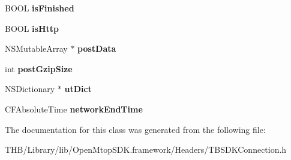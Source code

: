 \begin{DoxyCompactItemize}
\item 
\mbox{\label{interface_t_b_s_d_k_connection_acce8dd8a20a84f3a3c1cd34477b7c1f4}} 
B\+O\+OL {\bfseries is\+Finished}
\item 
\mbox{\label{interface_t_b_s_d_k_connection_ae0d8b0e9a2ffab51f7c52217f6e13edb}} 
B\+O\+OL {\bfseries is\+Http}
\item 
\mbox{\label{interface_t_b_s_d_k_connection_a36572ffb82b2d7b27e72c13c91c4f879}} 
N\+S\+Mutable\+Array $\ast$ {\bfseries post\+Data}
\item 
\mbox{\label{interface_t_b_s_d_k_connection_aa9331e40288bb5edc4591f1c1dbe9ce0}} 
int {\bfseries post\+Gzip\+Size}
\item 
\mbox{\label{interface_t_b_s_d_k_connection_a92c7092323d0a11dc96e27065f6d45e8}} 
N\+S\+Dictionary $\ast$ {\bfseries ut\+Dict}
\item 
\mbox{\label{interface_t_b_s_d_k_connection_af90cf0e6410b4bdc433de40f9deef88b}} 
C\+F\+Absolute\+Time {\bfseries network\+End\+Time}
\end{DoxyCompactItemize}


The documentation for this class was generated from the following file\+:\begin{DoxyCompactItemize}
\item 
T\+H\+B/\+Library/lib/\+Open\+Mtop\+S\+D\+K.\+framework/\+Headers/T\+B\+S\+D\+K\+Connection.\+h\end{DoxyCompactItemize}
